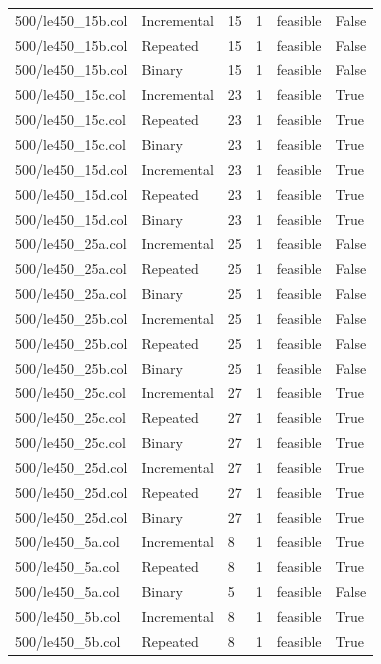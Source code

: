 \begin{table}[htbp]
\begin{tabular}{llllll}
500/le450\_15b.col & Incremental & 15 & 1 & feasible & False \\
500/le450\_15b.col & Repeated & 15 & 1 & feasible & False \\
500/le450\_15b.col & Binary & 15 & 1 & feasible & False \\
500/le450\_15c.col & Incremental & 23 & 1 & feasible & True \\
500/le450\_15c.col & Repeated & 23 & 1 & feasible & True \\
500/le450\_15c.col & Binary & 23 & 1 & feasible & True \\
500/le450\_15d.col & Incremental & 23 & 1 & feasible & True \\
500/le450\_15d.col & Repeated & 23 & 1 & feasible & True \\
500/le450\_15d.col & Binary & 23 & 1 & feasible & True \\
500/le450\_25a.col & Incremental & 25 & 1 & feasible & False \\
500/le450\_25a.col & Repeated & 25 & 1 & feasible & False \\
500/le450\_25a.col & Binary & 25 & 1 & feasible & False \\
500/le450\_25b.col & Incremental & 25 & 1 & feasible & False \\
500/le450\_25b.col & Repeated & 25 & 1 & feasible & False \\
500/le450\_25b.col & Binary & 25 & 1 & feasible & False \\
500/le450\_25c.col & Incremental & 27 & 1 & feasible & True \\
500/le450\_25c.col & Repeated & 27 & 1 & feasible & True \\
500/le450\_25c.col & Binary & 27 & 1 & feasible & True \\
500/le450\_25d.col & Incremental & 27 & 1 & feasible & True \\
500/le450\_25d.col & Repeated & 27 & 1 & feasible & True \\
500/le450\_25d.col & Binary & 27 & 1 & feasible & True \\
500/le450\_5a.col & Incremental & 8 & 1 & feasible & True \\
500/le450\_5a.col & Repeated & 8 & 1 & feasible & True \\
500/le450\_5a.col & Binary & 5 & 1 & feasible & False \\
500/le450\_5b.col & Incremental & 8 & 1 & feasible & True \\
500/le450\_5b.col & Repeated & 8 & 1 & feasible & True \\

\end{tabular}
\end{table}
